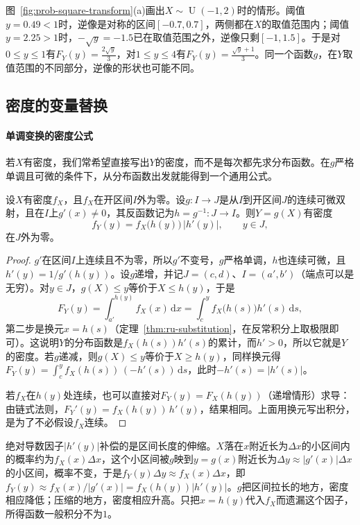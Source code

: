 图~\ref{fig:prob-square-transform}(a)画出$X\sim\operatorname{U}(-1,2)$时的情形。阈值$y=0.49<1$时，逆像是对称的区间$[-0.7,0.7]$，两侧都在$X$的取值范围内；阈值$y=2.25>1$时，$-\sqrt y=-1.5$已在取值范围之外，逆像只剩$[-1,1.5]$。于是对$0\leq y\leq1$有$F_Y(y)=\frac{2\sqrt y}{3}$，对$1\leq y\leq4$有$F_Y(y)=\frac{\sqrt y+1}{3}$。同一个函数$g$，在$Y$取值范围的不同部分，逆像的形状也可能不同。

\subsection{密度的变量替换}
\label{sec:prob-density-change}

\paragraph{单调变换的密度公式}
若$X$有密度，我们常希望直接写出$Y$的密度，而不是每次都先求分布函数。在$g$严格单调且可微的条件下，从分布函数出发就能得到一个通用公式。

\begin{theorem}[一元密度的变量替换]
\label{thm:prob-density-change}
设$X$有密度$f_X$，且$f_X$在开区间$I$外为零。设$g:I\to J$是从$I$到开区间$J$的连续可微双射，且在$I$上$g'(x)\neq0$，其反函数记为$h=g^{-1}:J\to I$。则$Y=g(X)$有密度
\[
  f_Y(y)=f_X\bigl(h(y)\bigr)\,\bigl|h'(y)\bigr|,\qquad y\in J,
\]
在$J$外为零。
\end{theorem}
\begin{proof}
$g'$在区间$I$上连续且不为零，所以$g'$不变号，$g$严格单调，$h$也连续可微，且$h'(y)=1/g'(h(y))$。设$g$递增，并记$J=(c,d)$、$I=(a',b')$（端点可以是无穷）。对$y\in J$，$g(X)\leq y$等价于$X\leq h(y)$，于是
\[
  F_Y(y)=\int_{a'}^{h(y)}f_X(x)\,\mathrm{d}x=\int_{c}^{y}f_X\bigl(h(s)\bigr)h'(s)\,\mathrm{d}s,
\]
第二步是换元$x=h(s)$（定理~\ref{thm:ru-substitution}，在反常积分上取极限即可）。这说明$Y$的分布函数是$f_X(h(s))h'(s)$的累计，而$h'>0$，所以它就是$Y$的密度。若$g$递减，则$g(X)\leq y$等价于$X\geq h(y)$，同样换元得$F_Y(y)=\int_c^yf_X(h(s))\,(-h'(s))\,\mathrm{d}s$，此时$-h'(s)=|h'(s)|$。

若$f_X$在$h(y)$处连续，也可以直接对$F_Y(y)=F_X(h(y))$（递增情形）求导：由链式法则，$F_Y'(y)=f_X(h(y))\,h'(y)$，结果相同。上面用换元写出积分，是为了不必假设$f_X$连续。
\end{proof}

绝对导数因子$|h'(y)|$补偿的是区间长度的伸缩。$X$落在$x$附近长为$\Delta x$的小区间内的概率约为$f_X(x)\Delta x$，这个小区间被$g$映到$y=g(x)$附近长为$\Delta y\approx|g'(x)|\Delta x$的小区间，概率不变，于是$f_Y(y)\Delta y\approx f_X(x)\Delta x$，即$f_Y(y)\approx f_X(x)/|g'(x)|=f_X(h(y))|h'(y)|$。$g$把区间拉长的地方，密度相应降低；压缩的地方，密度相应升高。只把$x=h(y)$代入$f_X$而遗漏这个因子，所得函数一般积分不为$1$。

